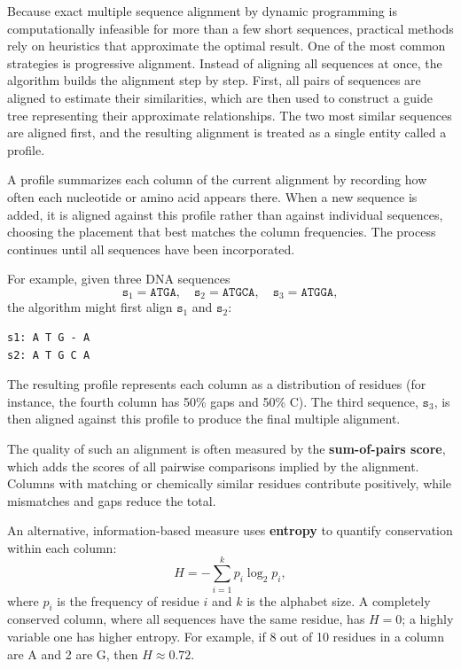 Because exact multiple sequence alignment by dynamic programming is computationally infeasible for more than a few short sequences, practical methods rely on heuristics that approximate the optimal result. One of the most common strategies is progressive alignment. Instead of aligning all sequences at once, the algorithm builds the alignment step by step. First, all pairs of sequences are aligned to estimate their similarities, which are then used to construct a guide tree 
representing their approximate relationships. The two most similar sequences are aligned first, and the resulting alignment is treated as a single entity called a profile.  

A profile summarizes each column of the current alignment by recording how often each nucleotide or amino acid appears there. When a new sequence is added, it is aligned against this profile rather than against individual sequences, choosing the placement that best matches the column frequencies. The process continues until all sequences have been incorporated.  

For example, given three DNA sequences  
\[
\texttt{s}_1 = \texttt{ATGA}, \quad 
\texttt{s}_2 = \texttt{ATGCA}, \quad 
\texttt{s}_3 = \texttt{ATGGA},
\]
the algorithm might first align $\texttt{s}_1$ and $\texttt{s}_2$:
\begin{verbatim}
s1: A T G - A
s2: A T G C A
\end{verbatim}
The resulting profile represents each column as a distribution of residues (for instance, the fourth column has 50\% gaps and 50\% C). The third sequence, $\texttt{s}_3$, is then aligned against this profile to produce the final multiple alignment.

The quality of such an alignment is often measured by the \textbf{sum-of-pairs score}, which adds the scores of all pairwise comparisons implied by the alignment. Columns with matching or chemically similar residues contribute positively, while mismatches and gaps reduce the total.  

An alternative, information-based measure uses \textbf{entropy} to quantify conservation within each column:
\[
H = -\sum_{i=1}^{k} p_i \log_2 p_i,
\]
where $p_i$ is the frequency of residue $i$ and $k$ is the alphabet size. A completely conserved column, where all sequences have the same residue, has $H = 0$; a highly variable one has higher entropy. For example, if 8 out of 10 residues in a column are A and 2 are G, then $H \approx 0.72$.  

